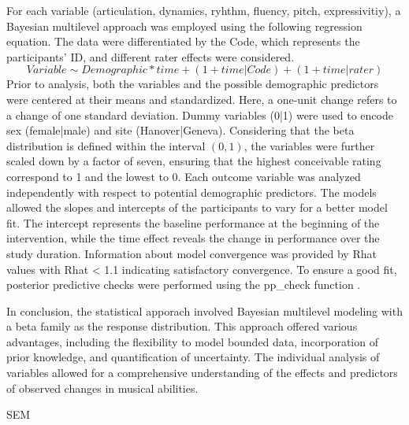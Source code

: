 For each variable (articulation, dynamics, ryhthm, fluency, pitch, expressivitiy), a Bayesian multilevel approach was employed using the following regression equation. The data were differentiated by the Code, which represents the participants' ID, and different rater effects were considered.
\begin{equation}
	Variable \sim Demographic*time + (1 + time|Code) + (1+ time|rater)
\end{equation}
Prior to analysis, both the variables and the possible demographic predictors were centered at their means and standardized. Here, a one-unit change refers to a change of one standard deviation. Dummy variables (0|1) were used to encode sex (female|male) and site (Hanover|Geneva). Considering that the beta distribution is defined within the interval $(0,1)$, the variables were further scaled down by a  factor of seven, ensuring that the highest conceivable rating correspond to 1 and the lowest to 0. Each outcome variable was analyzed independently with respect to potential demographic predictors. 
The models allowed the slopes and intercepts of the participants to vary for a better model fit. The intercept represents the baseline performance at the beginning of the intervention, while the time effect reveals the change in performance over the study duration. 
Information about model convergence was provided by Rhat values with Rhat < 1.1 indicating satisfactory convergence. To ensure a good fit, posterior predictive checks were performed using the pp\_check function \cite{Gabry2019}.

In conclusion, the statistical apporach involved Bayesian multilevel modeling with a beta family as the response distribution. This approach offered various advantages, including the flexibility to model bounded data, incorporation of prior knowledge, and quantification of uncertainty. The individual analysis of variables allowed for a comprehensive understanding of the effects and predictors of observed changes in musical abilities. 

SEM 


